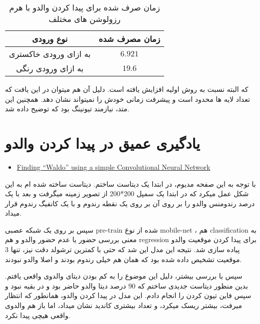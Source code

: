 \documentclass[a4paper,12pt]{article}
\begin{document}
\begin{table}[h]
	\centering
	\begin{tabular}{|c|c|}
		\hline
		\textbf\textbf{نوع ورودی} & \textbf{زمان مصرف شده} \\
		\hline
		به ازای ورودی خاکستری & $6.921$ \\
		\hline
		به ازای ورودی رنگی & $19.6$ \\
		\hline	
	\end{tabular}
	\caption{زمان صرف شده برای پیدا کردن والدو با هرم رزولوشن های مختلف}
\end{table}

که البته نسبت به روش اولیه افزایش یافته است. دلیل آن هم میتوان در این یافت که تعداد لایه ها محدود است و پیشرفت زمانی خودش را نمیتواند نشان دهد. همچنین این متد، نیازمند تیونینگ بود که توضیح داده شد. 

\section*{یادگیری عمیق در پیدا کردن والدو}

\begin{latin}
	\begin{itemize}
		\item \href{https://medium.com/analytics-vidhya/finding-waldo-using-a-simple-convolutional-neural-network-1604cb4d2e55}{Finding “Waldo” using a simple Convolutional Neural Network}
	\end{itemize}
\end{latin}

با توجه به این صفحه مدیوم، در ابتدا یک دیتاست ساختم. دیتاست ساخته شده ام به این شکل عمل میکرد که در ابتدا یک سمپل 200*200 از تصویر زمینه میگرفت و بعد با یک درصد رندومنس والدو را بر روی آن بر روی یک نقطه رندوم و با یک کانفیگ رندوم قرار میداد.

سپس بر روی یک شبکه عصبی pre-train شده از نوع mobile-net ، هم classification به معنی بررسی حضور یا عدم حضور والدو و هم regression برای پیدا کردن موقعیت والدو پیاده سازی شد. نتیجه این مدل این شد که حتی با کمترین ترشولد دقت نیز، تنها 3 موقعیت تشخیص داده شده بود که همان هم خیلی رندوم بودند و اصلا والدو نبودند.

سپس با بررسی بیشتر، دلیل این موضوع را به کم بودن دیتای والدوی واقعی یافتم. بدین منظور دیتاست جدیدی ساختم که 90 درصد دیتا والدو حاضر بود و در بقیه نبود و سپس فاین تیون کردن را انجام دادم. این مدل در پیدا کردن والدو، همانطور که انتظار میرفت، بیشتر ریسک میکرد، و تعداد بیشتری کاندید نشان میداد، اما باز هم والدوی واقعی هیچی پیدا نکرد.
\end{document}
